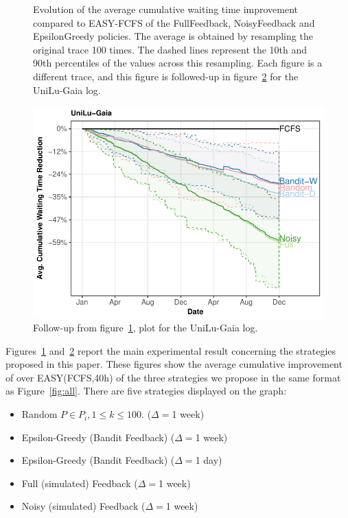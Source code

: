 \documentclass[sigconf,anonymous]{acmart}
\begin{document}
\begin{figure}[]
  \caption{Evolution of the average cumulative waiting time improvement
    compared to EASY-FCFS of the FullFeedback, NoisyFeedback and EpsilonGreedy
    policies. The average is obtained by resampling the original trace 100
    times. The dashed lines represent the 10th and 90th percentiles of the
  values across this resampling. Each figure is a different trace, and this
figure is followed-up in figure~\ref{fig:follow} for the UniLu-Gaia log.}

  \label{fig:small}
\end{figure}

\begin{figure}[]
  \centering
  \includegraphics[scale=0.6]{figures/UniLu-Ga.pdf}

  \caption{Follow-up from figure~\ref{fig:small}, plot for the UniLu-Gaia log.}

  \label{fig:follow}
\end{figure}

Figures~\ref{fig:small} and~\ref{fig:follow} report the main experimental
result concerning the strategies proposed in this paper. These figures show the
average cumulative improvement of over EASY(FCFS,40h) of the three strategies
we propose in the same format as Figure~\ref{fig:all}. There are five
strategies displayed on the graph:

\begin{itemize}
  \item Random $P \in P_i, 1 \le k \le 100$. ($\Delta=$1 week)
  \item Epsilon-Greedy (Bandit Feedback) ($\Delta=$1 week)
  \item Epsilon-Greedy (Bandit Feedback) ($\Delta=$1 day)
  \item Full (simulated) Feedback ($\Delta=$1 week)
  \item Noisy (simulated) Feedback ($\Delta=$1 week)
\end{itemize}
\end{document}
